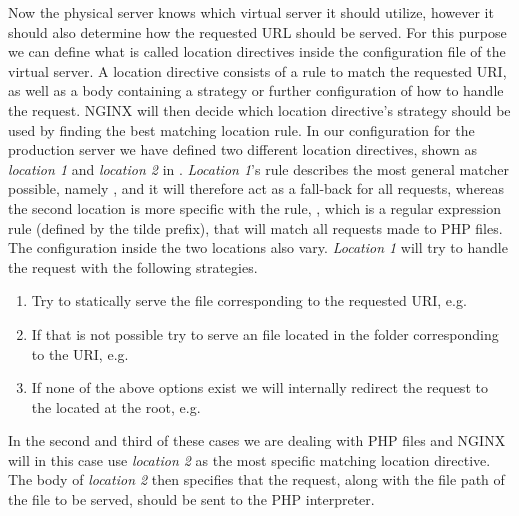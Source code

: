 Now the physical server knows which virtual server it should utilize, however it should also determine how the requested URL should be served. For this purpose we can define what is called location directives inside the configuration file of the virtual server. A location directive consists of a rule to match the requested URI, as well as a body containing a strategy or further configuration of how to handle the request. NGINX will then decide which location directive's strategy should be used by finding the best matching location rule. In our configuration for the production server we have defined two different location directives, shown as \emph{location 1} and \emph{location 2} in . \emph{Location 1}'s rule describes the most general matcher possible, namely , and it will therefore act as a fall-back for all requests, whereas the second location is more specific with the rule, , which is a regular expression rule (defined by the tilde prefix), that will match all requests made to PHP files. The configuration inside the two locations also vary. \emph{Location 1} will try to handle the request with the following strategies. 
\begin{enumerate}
    \setlength\itemsep{-0.2em}

	\item Try to statically serve the file corresponding to the requested URI, e.g.
	\\
	
    \item If that is not possible try to serve an  file located in the folder corresponding to the URI, e.g.
    \\

	\item If none of the above options exist we will internally redirect the request to the  located at the root, e.g.
	\\
\end{enumerate}

In the second and third of these cases we are dealing with PHP files and NGINX will in this case use \emph{location 2} as the most specific matching location directive. The body of \emph{location 2} then specifies that the request, along with the file path of the file to be served, should be sent to the PHP interpreter. 

